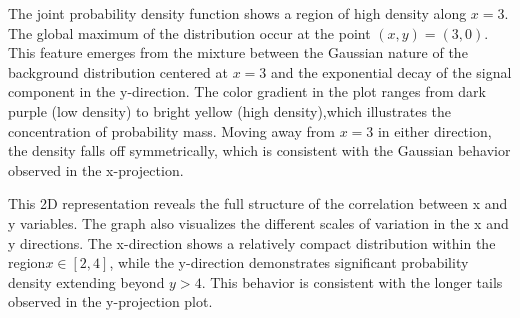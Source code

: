 \documentclass[a4paper, 12pt]{article}
\begin{document}
\par The joint probability density function shows a region of high density along $x = 3$. The global maximum of the distribution occur at the point $(x,y) = (3,0)$. This feature emerges from the mixture between the Gaussian nature of the background distribution centered at $x = 3$ and the exponential decay of the signal component in the y-direction. The color gradient in the plot ranges from dark purple (low density) to bright yellow (high density),which illustrates the concentration of probability mass. Moving away from $x = 3$ in either direction, the density falls off symmetrically, which is consistent with the Gaussian behavior observed in the x-projection. 
\par This 2D representation reveals the full structure of the correlation between x and y variables. The graph also visualizes the different scales of variation in the x and y directions. The x-direction shows a relatively compact distribution within the region$x \in [2,4]$, while the y-direction demonstrates significant probability density extending beyond $y > 4$. This behavior is consistent with the longer tails observed in the y-projection plot. 
\end{document}
